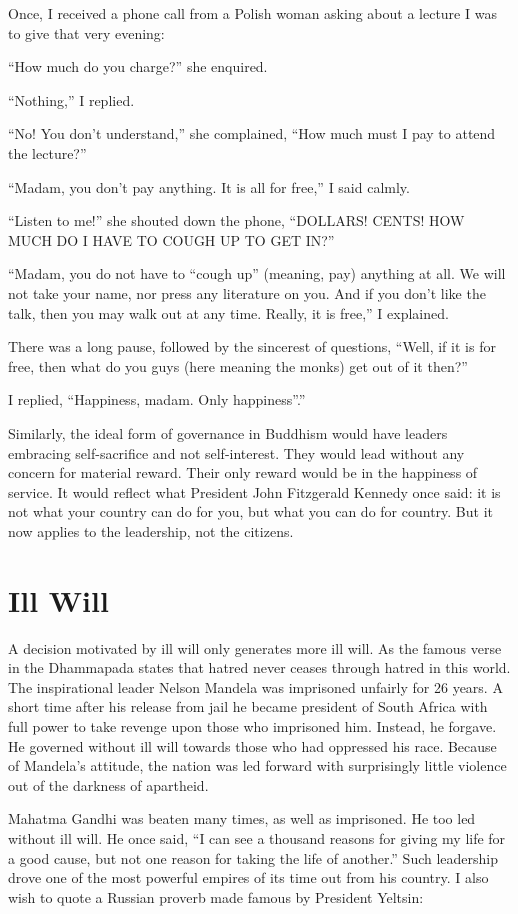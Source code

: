 ﻿\documentclass[11pt, openany]{book}
\begin{document}
Once, I received a phone call from a Polish woman asking about a lecture I was to give that very evening:

“How much do you charge?” she enquired.

“Nothing,” I replied.

“No! You don’t understand,” she complained, “How much must I pay to attend the lecture?”

“Madam, you don’t pay anything. It is all for free,” I said calmly.

“Listen to me!” she shouted down the phone, “DOLLARS! CENTS! HOW MUCH DO I HAVE TO COUGH UP TO GET IN?”

“Madam, you do not have to “cough up” (meaning, pay) anything at all. We will not take your name, nor press any literature on you. And if you don’t like the talk, then you may walk out at any time. Really, it is free,” I explained.

There was a long pause, followed by the sincerest of questions, “Well, if it is for free, then what do you guys (here meaning the monks) get out of it then?”

I replied, “Happiness, madam. Only happiness”.”

Similarly, the ideal form of governance in Buddhism would have leaders embracing self-sacrifice and not self-interest. They would lead without any concern for material reward. Their only reward would be in the happiness of service. It would reflect what President John Fitzgerald Kennedy once said: it is not what your country can do for you, but what you can do for country. But it now applies to the leadership, not the citizens.

\section{Ill Will}

A decision motivated by ill will only generates more ill will. As the famous verse in the Dhammapada states that hatred never ceases through hatred in this world. The inspirational leader Nelson Mandela was imprisoned unfairly for 26 years. A short time after his release from jail he became president of South Africa with full power to take revenge upon those who imprisoned him. Instead, he forgave. He governed without ill will towards those who had oppressed his race. Because of Mandela’s attitude, the nation was led forward with surprisingly little violence out of the darkness of apartheid.

Mahatma Gandhi was beaten many times, as well as imprisoned. He too led without ill will. He once said, “I can see a thousand reasons for giving my life for a good cause, but not one reason for taking the life of another.” Such leadership drove one of the most powerful empires of its time out from his country. I also wish to quote a Russian proverb made famous by President Yeltsin:
\end{document}
